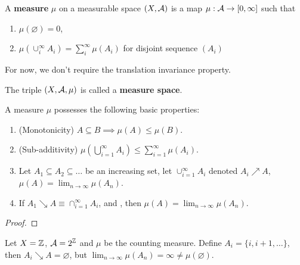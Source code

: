 \documentclass[11pt]{article}
\begin{document}
	\begin{definition}
		A \textbf{measure} $\mu$ on a measurable space $(X, \mathcal{{A}})$ is a map $\mu: \mathcal{{A}} \to [0, \infty]$ such that
		\begin{enumerate}
			\item $\mu(\varnothing) = 0$,
			\item $\mu(\cup_i^\infty A_i) = \sum_{i}^\infty \mu(A_i)$ for disjoint sequence $(A_i)$
		\end{enumerate}
		For now, we don't require the translation invariance property.
		
		The triple $(X, \mathcal{{A}}, \mu)$ is called a \textbf{measure space}.
	\end{definition}
	
	\begin{example}
		
	\end{example}
	
	\begin{example}
		
	\end{example}
	
	\begin{proposition}
		A measure $\mu$ possesses the following basic properties:
		\begin{enumerate}
			\item (Monotonicity) $A \subseteq B \implies \mu(A) \leq \mu(B)$.
			\item (Sub-additivity) $\mu(\bigcup_{i=1}^\infty A_i) \leq \sum_{i=1}^\infty \mu(A_i)$.
			\item Let $A_1 \subseteq A_2 \subseteq \dots$ be an increasing set, let $\cup_{i=1}^\infty A_i$ denoted $A_i \nearrow A$, $\mu(A) = \lim_{n \to \infty} \mu(A_n)$.
			\item If $A_1 \searrow A \equiv \cap_{i=1}^\infty A_i$, and , then $\mu(A) = \lim_{n \to \infty} \mu(A_n)$.
		\end{enumerate}
		\begin{proof}
			
		\end{proof}
	\end{proposition}
	
	\begin{example}
		Let $X = \mathbb{Z}$, $\mathcal{{A}} = 2^{\mathbb{Z}}$ and $\mu$ be the counting measure. Define $A_i = \{i, i+1, \dots \}$, then $A_i \searrow A = \varnothing$, but $\lim_{n \to \infty} \mu(A_n) = \infty \neq \mu(\varnothing)$.
	\end{example}
	
\end{document}
